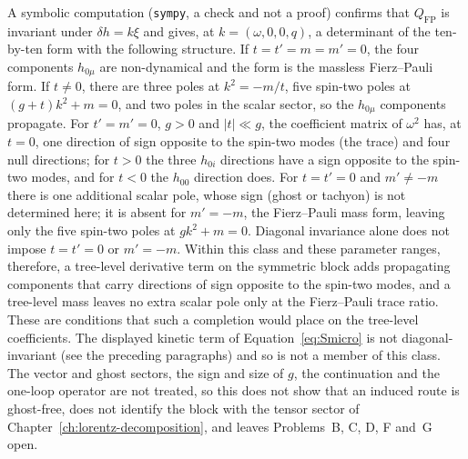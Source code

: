 A symbolic computation (\texttt{sympy}, a check and not a proof) confirms
that \(Q_{\mathrm{FP}}\) is invariant under \(\delta h=k\xi\) and gives,
at \(k=(\omega,0,0,q)\), a determinant of the ten-by-ten form with the
following structure.  If \(t=t'=m=m'=0\), the four components \(h_{0\mu}\)
are non-dynamical and the form is the massless Fierz--Pauli form.  If
\(t\neq0\), there are three poles at \(k^2=-m/t\), five spin-two poles at
\((g+t)k^2+m=0\), and two poles in the scalar sector, so the
\(h_{0\mu}\) components propagate.  For \(t'=m'=0\), \(g>0\) and
\(|t|\ll g\), the coefficient matrix of \(\omega^2\) has, at \(t=0\), one
direction of sign opposite to the spin-two modes (the trace) and four null
directions; for \(t>0\) the three \(h_{0i}\) directions have a sign opposite
to the spin-two modes, and for \(t<0\) the \(h_{00}\) direction does.  For
\(t=t'=0\) and \(m'\neq-m\) there is one additional scalar pole, whose
sign (ghost or tachyon) is not determined here; it is absent for
\(m'=-m\), the Fierz--Pauli mass form, leaving only the five spin-two poles
at \(gk^2+m=0\).  Diagonal invariance alone does not impose \(t=t'=0\) or
\(m'=-m\).  Within this class and these parameter ranges, therefore, a
tree-level derivative term on the symmetric block adds propagating
components that carry directions of sign opposite to the spin-two modes,
and a tree-level mass leaves no extra scalar pole only at the
Fierz--Pauli trace ratio.  These are conditions that such a completion
would place on the tree-level coefficients.  The displayed kinetic term of
Equation~\eqref{eq:Smicro} is not diagonal-invariant (see the preceding
paragraphs) and so is not a member of this class.  The vector and ghost
sectors, the sign and size of \(g\), the continuation and the one-loop
operator are not treated, so this does not show that an induced route is
ghost-free, does not identify the block with the tensor sector of
Chapter~\ref{ch:lorentz-decomposition}, and leaves Problems~B, C, D, F
and~G open.


